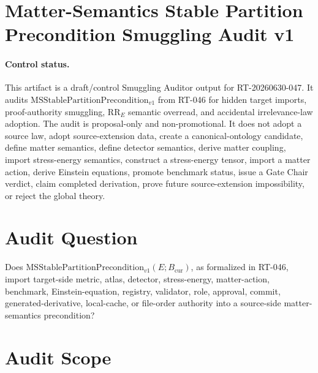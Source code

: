 \section*{Matter-Semantics Stable Partition Precondition Smuggling Audit v1}

\paragraph{Control status.}
This artifact is a draft/control Smuggling Auditor output for
RT-20260630-047. It audits
\(\mathrm{MSStablePartitionPrecondition}_{v1}\) from RT-046 for hidden target
imports, proof-authority smuggling, \(\mathrm{RR}_E\) semantic overread, and
accidental irrelevance-law adoption. The audit is proposal-only and
non-promotional. It does not adopt a source law, adopt source-extension data,
create a canonical-ontology candidate, define matter semantics, define
detector semantics, derive matter coupling, import stress-energy semantics,
construct a stress-energy tensor, import a matter action, derive Einstein
equations, promote benchmark status, issue a Gate Chair verdict, claim
completed derivation, prove future source-extension impossibility, or reject
the global theory.

\newcommand{\Bcur}{B_{\mathrm{cur}}}
\newcommand{\MSStablePre}{\mathrm{MSStablePartitionPrecondition}_{v1}}
\newcommand{\MSSig}{\Sigma^{\mathrm{rep}}_E}
\newcommand{\MSPart}{\Pi^{\mathrm{st}}_E}
\newcommand{\MSGuard}{G^{\mathrm{st}}_E}
\newcommand{\MSFail}{\mathrm{MSStablePartitionFailure}_{v1}}
\newcommand{\NoTarget}{\mathrm{NoTargetImport}_{v1}}
\newcommand{\NoDetector}{\mathrm{NoDetectorImport}_{v1}}
\newcommand{\NoSE}{\mathrm{NoStressEnergyImport}_{v1}}
\newcommand{\NoAction}{\mathrm{NoMatterActionImport}_{v1}}

\section{Audit Question}

Does \(\MSStablePre(E;\Bcur)\), as formalized in RT-046, import target-side
metric, atlas, detector, stress-energy, matter-action, benchmark,
Einstein-equation, registry, validator, role, approval, commit,
generated-derivative, local-cache, or file-order authority into a source-side
matter-semantics precondition?

\section{Audit Scope}

